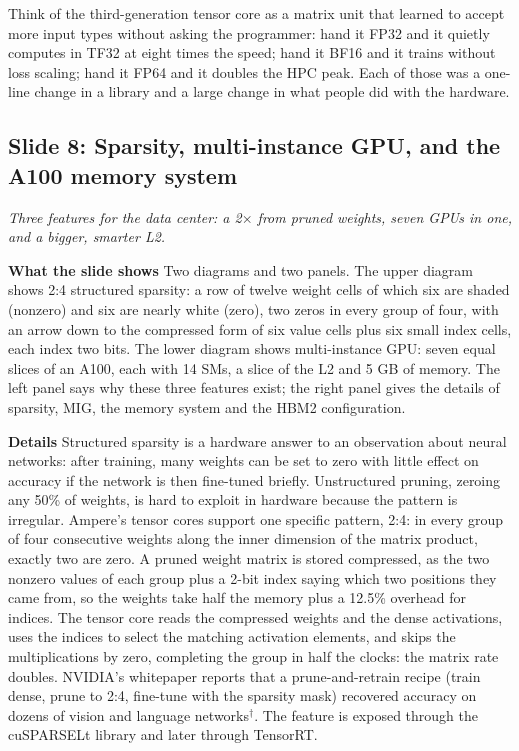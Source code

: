 \documentclass[11pt,letterpaper]{article}
\newcommand{\slide}[3]{%
  \subsection[Slide #1: #2]{Slide #1: #2}%
  {\color{muted}\itshape #3\par}\medskip}
\newcommand{\para}[1]{\medskip\noindent\textbf{#1}\quad}
\newenvironment{intuition}{\begin{tcolorbox}[intuitionbox]}{\end{tcolorbox}}
\begin{document}
\begin{intuition}
Think of the third-generation tensor core as a matrix unit that learned to accept more input types without asking the programmer: hand it FP32 and it quietly computes in TF32 at eight times the speed; hand it BF16 and it trains without loss scaling; hand it FP64 and it doubles the HPC peak. Each of those was a one-line change in a library and a large change in what people did with the hardware.
\end{intuition}

\slide{8}{Sparsity, multi-instance GPU, and the A100 memory system}{Three features for the data center: a 2$\times$ from pruned weights, seven GPUs in one, and a bigger, smarter L2.}

\para{What the slide shows} Two diagrams and two panels. The upper diagram shows 2:4 structured sparsity: a row of twelve weight cells of which six are shaded (nonzero) and six are nearly white (zero), two zeros in every group of four, with an arrow down to the compressed form of six value cells plus six small index cells, each index two bits. The lower diagram shows multi-instance GPU: seven equal slices of an A100, each with 14 SMs, a slice of the L2 and 5 GB of memory. The left panel says why these three features exist; the right panel gives the details of sparsity, MIG, the memory system and the HBM2 configuration.

\para{Details} Structured sparsity is a hardware answer to an observation about neural networks: after training, many weights can be set to zero with little effect on accuracy if the network is then fine-tuned briefly. Unstructured pruning, zeroing any 50\% of weights, is hard to exploit in hardware because the pattern is irregular. Ampere's tensor cores support one specific pattern, 2:4: in every group of four consecutive weights along the inner dimension of the matrix product, exactly two are zero. A pruned weight matrix is stored compressed, as the two nonzero values of each group plus a 2-bit index saying which two positions they came from, so the weights take half the memory plus a 12.5\% overhead for indices. The tensor core reads the compressed weights and the dense activations, uses the indices to select the matching activation elements, and skips the multiplications by zero, completing the group in half the clocks: the matrix rate doubles. NVIDIA's whitepaper reports that a prune-and-retrain recipe (train dense, prune to 2:4, fine-tune with the sparsity mask) recovered accuracy on dozens of vision and language networks$^\dagger$. The feature is exposed through the cuSPARSELt library and later through TensorRT.
\end{document}
